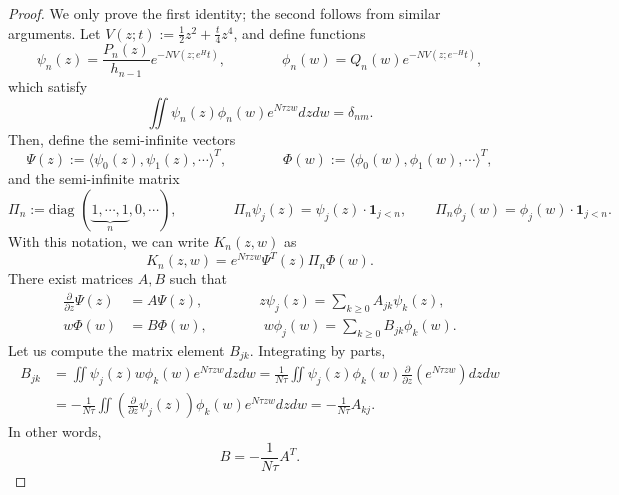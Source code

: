 \documentclass[usenames,dvipsnames]{article}
\theoremstyle{definition}
\numberwithin{equation}{section}
\numberwithin{figure}{section}
\begin{document}
\begin{proof}
    We only prove the first identity; the second follows from similar arguments. Let $V(z;t):=\frac{1}{2}z^2+\frac{t}{4}z^4$,
    and define functions
        \begin{equation}
            \psi_n(z) = \frac{P_n(z)}{h_{n-1}}e^{-NV(z;e^{H}t)},\qquad\qquad \phi_n(w) = Q_n(w)e^{-NV(z;e^{-H}t)},
        \end{equation}
    which satisfy 
        \begin{equation}
            \iint \psi_n(z) \phi_n(w)e^{N\tau zw} dzdw = \delta_{nm}.
        \end{equation}
    Then, define the semi-infinite vectors
    \begin{equation}
        \Psi(z) := \langle \psi_0(z),\psi_1(z),\cdots \rangle^T,\qquad\qquad \Phi(w) := \langle \phi_0(w),\phi_1(w),\cdots \rangle^T,
    \end{equation}
and the semi-infinite matrix
    \begin{equation}
        \Pi_n:=\text{diag }(\underbrace{1,\cdots,1}_{n},0,\cdots), \qquad\qquad \Pi_n \psi_j(z) = \psi_j(z) \cdot \boldsymbol{1}_{j<n},
        \qquad \Pi_n \phi_j(w) = \phi_j(w) \cdot \boldsymbol{1}_{j<n}.
    \end{equation}
With this notation, we can write $K_n(z,w)$ as
    \begin{equation*}
        K_n(z,w) = e^{N\tau zw} \Psi^T(z)\Pi_n\Phi(w).
    \end{equation*}
There exist matrices $A,B$ such that
    \begin{align*}
        \frac{\partial}{\partial z}\Psi(z) &= A\Psi(z),\qquad\qquad z\psi_j(z) = \sum_{k\geq 0} A_{jk}\psi_k(z),\\
        w\Phi(w) &= B\Phi(w),\qquad\qquad w\phi_j(w) = \sum_{k\geq 0} B_{jk}\phi_k(w).
    \end{align*}
Let us compute the matrix element $B_{jk}$. Integrating by parts,
    \begin{align*}
        B_{jk} &= \iint \psi_j(z)w\phi_k(w)e^{N\tau zw}dzdw = \frac{1}{N\tau}\iint \psi_j(z)\phi_k(w)\frac{\partial}{\partial z}\left(e^{N\tau zw}\right)dzdw\\
        &= -\frac{1}{N\tau}\iint\left(\frac{\partial}{\partial z}\psi_j(z)\right)\phi_k(w)e^{N\tau zw}dzdw = -\frac{1}{N\tau} A_{kj}.
    \end{align*}
In other words,
    \begin{equation}
        B = -\frac{1}{N\tau} A^T.
    \end{equation}

\end{proof}
\end{document}
